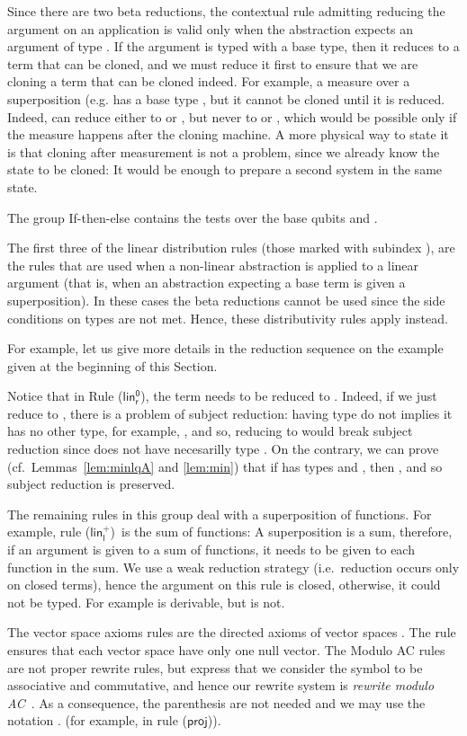 \documentclass[preprint]{elsarticle}
\newcommand\s[1]{\ensuremath{\mathsf{#1}}}
\newcommand\rlinzr{(\s{lin^0_r})}
\newcommand\rlinl{(\s{lin^+_l})}
\newcommand\rproj{(\s{proj})}
\begin{document}
Since there are two beta reductions, the contextual rule admitting reducing the
argument on an application is valid only when the abstraction expects an
argument of type . If the argument is typed with a base type, then it
reduces to a term that can be cloned, and we must reduce it first to ensure that
we are cloning a term that can be cloned indeed. For example, a measure over a
superposition (e.g.  has a base type , but it
cannot be cloned until it is reduced. Indeed,  can reduce either to  or
, but never to  or , which would be
possible only if the measure happens after the cloning machine. A more physical
way to state it is that cloning after measurement is not a problem, since we
already know the state to be cloned: It would be enough to prepare a second
system in the same state.

The group If-then-else contains the tests over the base qubits  and
.

The first three of the linear distribution rules (those marked with subindex
), are the rules that are used when a non-linear abstraction is applied to a
linear argument (that is, when an abstraction expecting a base term is given a
superposition). In these cases the beta reductions cannot be used since the side
conditions on types are not met. Hence, these distributivity rules apply
instead.

For example, let us give more details in the reduction sequence on the example
given at the beginning of this Section.


Notice that in Rule \rlinzr, the term needs to be reduced to
. Indeed, if we just reduce  to , there is a
problem of subject reduction:  having type  do not implies
it has no other type, for example, , and so, reducing to 
would break subject reduction since  does not have necesarilly type .
On the contrary, we can prove (cf.~Lemmas~\ref{lem:minlqA} and \ref{lem:min}) that if  has types  and
, then , and so subject reduction is preserved.

The remaining rules in this group deal with a superposition of functions. For
example, rule \rlinl\ is the sum of functions: A superposition is a sum,
therefore, if an argument is given to a sum of functions, it needs to be given
to each function in the sum. We use a weak reduction strategy (i.e.~reduction
occurs only on closed terms), hence the argument  on this rule is closed,
otherwise, it could not be typed. For example  is
derivable, but  is not.

The vector space axioms rules are the directed axioms of vector spaces
\cite{ArrighiDowekRTA08,AssafDiazcaroPerdrixTassonValironLMCS14}. The rule
 ensures that each vector space have only one null vector. The Modulo
AC rules are not proper rewrite rules, but express that we consider the symbol
 to be associative and commutative, and hence our rewrite system is {\em
  rewrite modulo AC}~\cite{PetersonStickelJACM81}. As a consequence, the
parenthesis are not needed and we may use the notation .
(for example, in rule \rproj).
\end{document}
